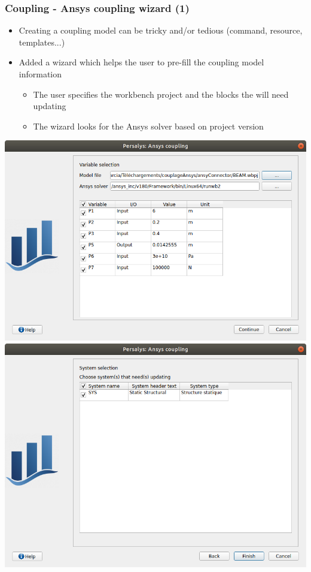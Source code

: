 \documentclass[aspectratio=169]{beamer}
\begin{document}
\begin{frame}
  \frametitle{Coupling - Ansys coupling wizard (1)}
  \begin{itemize}
  \item Creating a coupling model can be tricky and/or tedious (command, resource, templates...)
  \item Added a wizard which helps the user to pre-fill the coupling model information
    \begin{itemize}
    \item The user specifies the workbench project and the blocks the will need updating
    \item The wizard looks for the Ansys solver based on project version
    \end{itemize}
  \end{itemize}
 \begin{center}
    \includegraphics[height=0.6\textheight]{figures/ansys1.png}\includegraphics[height=0.6\textheight]{figures/ansys2.png}
 \end{center}
\end{frame}
\end{document}
